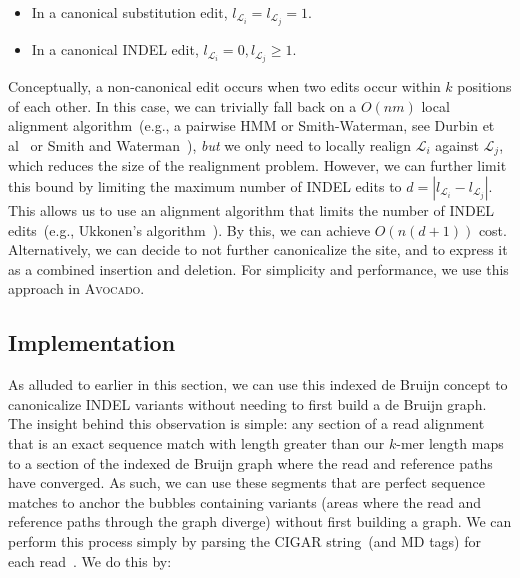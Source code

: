 \documentclass[phd]{ucbthesis}
\begin{document}
\begin{itemize}
\item In a canonical substitution edit, $l_{\mathcal{L}_i} = l_{\mathcal{L}_j} = 1$.
\item In a canonical INDEL edit, $l_{\mathcal{L}_i} = 0, l_{\mathcal{L}_j} \ge 1$.
\end{itemize}

Conceptually, a non-canonical edit occurs when two edits occur within $k$ positions of each other. In
this case, we can trivially fall back on a $O(nm)$ local alignment algorithm~(e.g., a pairwise HMM or
Smith-Waterman, see Durbin et al~\cite{durbin98} or Smith and Waterman~\cite{smith81}), \emph{but} we only need to locally realign
$\mathcal{L}_i$ against $\mathcal{L}_j$, which reduces the size of the realignment problem. However, we
can further limit this bound by limiting the maximum number of INDEL edits to $d = | l_{\mathcal{L}_i} -
l_{\mathcal{L}_j} |$. This allows us to use an alignment algorithm that limits the number of INDEL
edits~(e.g., Ukkonen's algorithm~\cite{ukkonen85}). By this, we can achieve $O(n(d + 1))$ cost.
Alternatively, we can decide to not further canonicalize the site, and to express it as a combined
insertion and deletion. For simplicity and performance, we use this approach in \textsc{Avocado}.

\subsection{Implementation}
\label{sec:implementation}

As alluded to earlier in this section, we can use this indexed de Bruijn concept
to canonicalize INDEL variants without needing to first build a de Bruijn graph.
The insight behind this observation is simple: any section of a read alignment
that is an exact sequence match with length greater than our $k$-mer length maps
to a section of the indexed de Bruijn graph where the read and reference paths
have converged. As such, we can use these segments that are perfect sequence
matches to anchor the bubbles containing variants (areas where the read and
reference paths through the graph diverge) without first building a graph.
We can perform this process simply by parsing the CIGAR string~(and MD tags)
for each read~\cite{li09}. We do this by:
\end{document}
